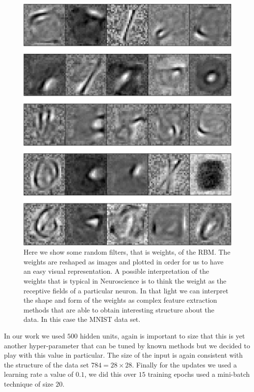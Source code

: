 \documentclass[11pt,a4paper]{article}
\begin{document}
 
\begin{center}
\begin{figure}[H]
\centering
\includegraphics[scale=.45]{final_filters.pdf} 
\caption{Here we show some random filters, that is weights, of the RBM. The weights are reshaped as images and plotted in order for us to have an easy visual representation. A possible interpretation of the weights that is typical in Neuroscience is to think the weight as the receptive fields of a particular neuron. In that light we can interpret the shape and form of the weights as complex feature extraction methods that are able to obtain interesting structure about the data. In this case the MNIST data set.}
\label{fig:rbm_filters}
\end{figure} 
\end{center}

In our work we used $500$ hidden units, again is important to size that this is yet another hyper-parameter that can be tuned by known methods but we decided to play with this value in particular. The size of the input is again consistent with the structure of the data set $784 = 28 \times 28$. Finally for the updates we used a learning rate a value of $0.1$, we did this over $15$ training epochs used a mini-batch technique of size $20$.  
\end{document}
